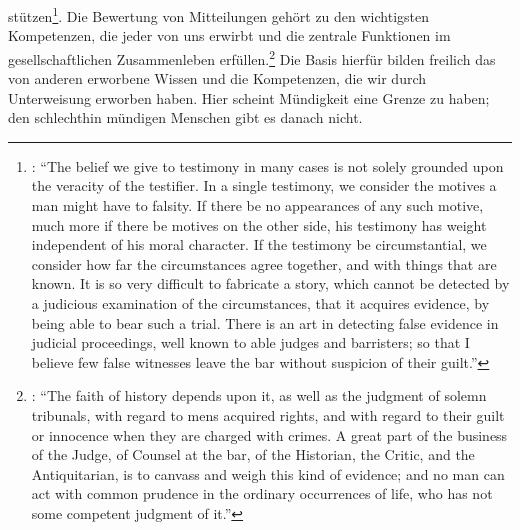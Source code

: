 stützen\footnote{\cite[Vgl.][558]{Reid:EssaysontheIntellectualPowersofMan2002}:
\enquote{The belief we give to testimony in many cases is not solely grounded
upon the veracity of the testifier. In a single testimony, we consider the
motives a man might have to falsity. If there be no appearances of any such
motive, much more if there be motives on the other side, his testimony has
weight independent of his moral character. If the testimony be circumstantial,
we consider how far the circumstances agree together, and with things that are
known. It is so very difficult to fabricate a story, which cannot be detected by
a judicious examination of the circumstances, that it acquires evidence, by
being able to bear such a trial. There is an art in detecting false evidence in
judicial proceedings, well known to able judges and barristers; so that I
believe few false witnesses leave the bar without suspicion of their guilt.}}.
Die Bewertung von Mitteilungen gehört zu den wichtigsten Kompetenzen, die jeder von uns erwirbt
und die zentrale Funktionen im gesellschaftlichen Zusammenleben
erfüllen.\footnote{\cite[Vgl.][\pno~557f.]{Reid:EssaysontheIntellectualPowersofMan2002}:
\enquote{The faith of history depends upon it, as well as the judgment of solemn
tribunals, with regard to mens acquired rights, and with regard to their guilt
or innocence when they are charged with crimes. A great part of the business of
the Judge, of Counsel at the bar, of the Historian, the Critic, and the
Antiquitarian, is to canvass and weigh this kind of evidence; and no man can act
with common prudence in the ordinary occurrences of life, who has not some
competent judgment of
it.}} Die Basis hierfür bilden freilich das von anderen erworbene Wissen und die
Kompetenzen, die wir durch Unterweisung erworben haben. Hier scheint
Mündigkeit eine Grenze zu haben; den schlechthin mündigen Menschen gibt es
danach nicht.

